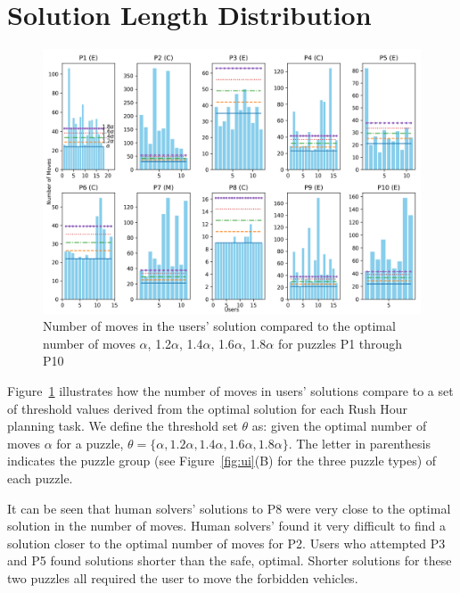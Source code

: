 \section{Solution Length Distribution}
\label{ap:distribution}
\begin{figure}[tpb]
  \centering
\includegraphics[width=\columnwidth]{img/figure7.jpg}
  \caption{Number of moves in the users' solution compared to the optimal number of moves $\alpha$, 1.2$\alpha$, 1.4$\alpha$, 1.6$\alpha$, 1.8$\alpha$ for puzzles P1 through P10}
  \label{fig:difficulty}
\end{figure}

Figure~\ref{fig:difficulty} illustrates how the number of moves in users' solutions compare to a set of threshold values derived from the optimal solution for each Rush Hour planning task. We define the threshold set $\theta$ as: given the optimal number of moves  $\alpha$ for a puzzle, $\theta=\lbrace \alpha, 1.2\alpha, 1.4\alpha, 1.6\alpha, 1.8\alpha\rbrace$. The letter in parenthesis indicates the puzzle group (see Figure~\ref{fig:ui}(B) for the three puzzle types) of each puzzle.

It can be seen that human solvers' solutions to P8 were very close to the optimal solution in the number of moves. Human solvers' found it very difficult to find a solution closer to the optimal number of moves for P2.
Users who attempted P3 and P5 found solutions shorter than the safe, optimal. Shorter solutions for these two puzzles all required the user to move the forbidden vehicles.